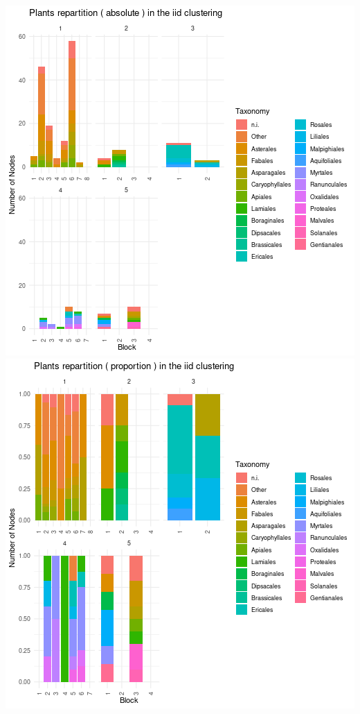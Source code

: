 \includegraphics{./img/482a3d80d6f3afab8ca8818d634d42ce2fc8e6d0.png}\includegraphics{./img/05f987b57c85b14df8f5e89bf0e380ecc9721edc.png}

